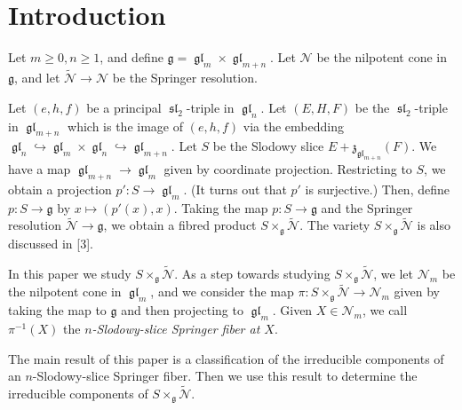\documentclass[12pt,psamsfonts]{article}
\DeclareMathOperator{\gl}{\mathfrak{gl}}
\DeclareMathOperator{\spl}{\mathfrak{sl}}
\begin{document}
\section{Introduction}
Let \(m \geq 0, n \geq 1\), and define \(\mathfrak{g} = \gl_m \times \gl_{m + n}\).
Let \(\mathcal{N}\) be the nilpotent cone in \(\mathfrak{g}\), and let \(\widetilde{\mathcal{N}} \to \mathcal{N}\) be the Springer resolution.
\par Let \((e, h, f)\) be a principal \(\spl_2\)-triple in \(\gl_n\).
Let \((E, H, F)\) be the \(\spl_2\)-triple in \(\gl_{m + n}\) which is the image of \((e, h, f)\) via the embedding \(\gl_n \hookrightarrow \gl_m \times \gl_n \hookrightarrow \gl_{m + n}\).
Let \(S\) be the Slodowy slice \(E + \mathfrak{z}_{\gl_{m + n}}(F)\).
We have a map \(\gl_{m + n} \to \gl_m\) given by coordinate projection.
Restricting to \(S\), we obtain a projection \(p' : S \to \gl_m\).
(It turns out that \(p'\) is surjective.)
Then, define \(p : S \to \mathfrak{g}\) by \(x \mapsto (p'(x), x)\).
Taking the map \(p : S \to \mathfrak{g}\) and the Springer resolution \(\widetilde{\mathcal{N}} \to \mathfrak{g}\), we obtain a fibred product \(S \times_\mathfrak{g} \widetilde{\mathcal{N}}\).
The variety \(S \times_\mathfrak{g} \widetilde{\mathcal{N}}\) is also discussed in \cite{sxn}[3].
\par In this paper we study \(S \times_\mathfrak{g} \widetilde{\mathcal{N}}\).
As a step towards studying \(S \times_\mathfrak{g} \widetilde{\mathcal{N}}\), we let \(\mathcal{N}_m\) be the nilpotent cone in \(\gl_m\), and we consider the map \(\pi : S \times_\mathfrak{g} \widetilde{\mathcal{N}} \to \mathcal{N}_m\) given by taking the map to \(\mathfrak{g}\) and then projecting to \(\gl_m\).
Given \(X \in \mathcal{N}_m\), we call \(\pi^{-1}(X)\) the \emph{\(n\)-Slodowy-slice Springer fiber at \(X\)}.
\par The main result of this paper is a classification of the irreducible components of an \(n\)-Slodowy-slice Springer fiber.
Then we use this result to determine the irreducible components of \(S \times_\mathfrak{g} \widetilde{\mathcal{N}}\).
\end{document}
